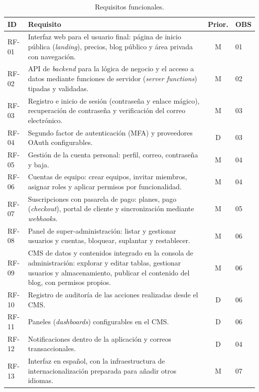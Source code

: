 \begin{table}[htbp]
  \centering
  \footnotesize
  \caption{Requisitos funcionales.}
  \label{tab:req-rf}
  \begin{tabularx}{\textwidth}{@{}lXcl@{}}
    \toprule
    \textbf{ID} & \textbf{Requisito} & \textbf{Prior.} & \textbf{OBS} \\
    \midrule
    RF-01 & Interfaz web para el usuario final: página de inicio pública (\textit{landing}), precios, blog público y área privada con navegación. & M & 01 \\
    RF-02 & API de \textit{backend} para la lógica de negocio y el acceso a datos mediante funciones de servidor (\textit{server functions}) tipadas y validadas. & M & 02 \\
    RF-03 & Registro e inicio de sesión (contraseña y enlace mágico), recuperación de contraseña y verificación del correo electrónico. & M & 03 \\
    RF-04 & Segundo factor de autenticación (MFA) y proveedores OAuth configurables. & D & 03 \\
    RF-05 & Gestión de la cuenta personal: perfil, correo, contraseña y baja. & M & 04 \\
    RF-06 & Cuentas de equipo: crear equipos, invitar miembros, asignar roles y aplicar permisos por funcionalidad. & M & 04 \\
    RF-07 & Suscripciones con pasarela de pago: planes, pago (\textit{checkout}), portal de cliente y sincronización mediante \textit{webhooks}. & M & 05 \\
    RF-08 & Panel de super-administración: listar y gestionar usuarios y cuentas, bloquear, suplantar y restablecer. & M & 06 \\
    RF-09 & CMS de datos y contenidos integrado en la consola de administración: explorar y editar tablas, gestionar usuarios y almacenamiento, publicar el contenido del blog, con permisos propios. & M & 06 \\
    RF-10 & Registro de auditoría de las acciones realizadas desde el CMS. & D & 06 \\
    RF-11 & Paneles (\textit{dashboards}) configurables en el CMS. & D & 06 \\
    RF-12 & Notificaciones dentro de la aplicación y correos transaccionales. & D & 04 \\
    RF-13 & Interfaz en español, con la infraestructura de internacionalización preparada para añadir otros idiomas. & M & 07 \\
    \bottomrule
  \end{tabularx}
\end{table}

